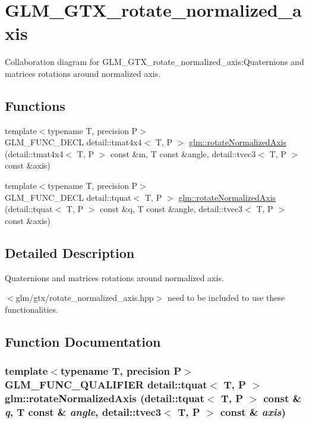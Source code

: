 \hypertarget{group__gtx__rotate__normalized__axis}{
\section{GLM\_\-GTX\_\-rotate\_\-normalized\_\-axis}
\label{group__gtx__rotate__normalized__axis}
}


Collaboration diagram for GLM\_\-GTX\_\-rotate\_\-normalized\_\-axis:Quaternions and matrices rotations around normalized axis.  
\subsection*{Functions}
\begin{CompactItemize}
\item 
{\footnotesize template$<$typename T, precision P$>$ }\\GLM\_\-FUNC\_\-DECL detail::tmat4x4$<$ T, P $>$ \hyperlink{group__gtx__rotate__normalized__axis_g9fc93bb16dd6719fc660a506cb833fb0}{glm::rotateNormalizedAxis} (detail::tmat4x4$<$ T, P $>$ const \&m, T const \&angle, detail::tvec3$<$ T, P $>$ const \&axis)
\item 
{\footnotesize template$<$typename T, precision P$>$ }\\GLM\_\-FUNC\_\-DECL detail::tquat$<$ T, P $>$ \hyperlink{group__gtx__rotate__normalized__axis_g34cc3bc3287bc3f56bac3c3a70cea353}{glm::rotateNormalizedAxis} (detail::tquat$<$ T, P $>$ const \&q, T const \&angle, detail::tvec3$<$ T, P $>$ const \&axis)
\end{CompactItemize}


\subsection{Detailed Description}
Quaternions and matrices rotations around normalized axis. 

$<$glm/gtx/rotate\_\-normalized\_\-axis.hpp$>$ need to be included to use these functionalities. 

\subsection{Function Documentation}
\hypertarget{group__gtx__rotate__normalized__axis_g34cc3bc3287bc3f56bac3c3a70cea353}{
\subsubsection[rotateNormalizedAxis]{\setlength{\rightskip}{0pt plus 5cm}template$<$typename T, precision P$>$ GLM\_\-FUNC\_\-QUALIFIER detail::tquat$<$ T, P $>$ glm::rotateNormalizedAxis (detail::tquat$<$ T, P $>$ const \& {\em q}, \/  T const \& {\em angle}, \/  detail::tvec3$<$ T, P $>$ const \& {\em axis})}}
\label{group__gtx__rotate__normalized__axis_g34cc3bc3287bc3f56bac3c3a70cea353}


